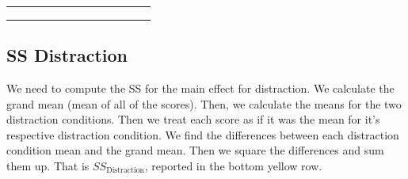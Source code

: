 \documentclass[
]{book}
\begin{document}
\begin{table}
\begin{tabular}{l|l|l|l|l|l|l|l|l|>{}l|>{}l|>{}l|>{}l}
\hline
\cellcolor{lightgreen}{Means} & \cellcolor{lightgreen}{9.6} & \cellcolor{lightgreen}{3.6} & \cellcolor{lightgreen}{12.6} & \cellcolor{lightgreen}{10} & \cellcolor{lightgreen}{} & \cellcolor{lightgreen}{} & \cellcolor{lightgreen}{} & \cellcolor{lightgreen}{} & \cellcolor{yellow}{} & \cellcolor{yellow}{} & \cellcolor{yellow}{} & \cellcolor{yellow}{}\\
\hline
\cellcolor{lightgreen}{Grand Mean} & \cellcolor{lightgreen}{8.95} & \cellcolor{lightgreen}{} & \cellcolor{lightgreen}{} & \cellcolor{lightgreen}{} & \cellcolor{lightgreen}{} & \cellcolor{lightgreen}{} & \cellcolor{lightgreen}{} & \cellcolor{lightgreen}{} & \cellcolor{yellow}{} & \cellcolor{yellow}{} & \cellcolor{yellow}{} & \cellcolor{yellow}{}\\
\hline
\cellcolor{yellow}{sums} & \cellcolor{yellow}{} & \cellcolor{yellow}{} & \cellcolor{yellow}{} & \cellcolor{yellow}{} & \cellcolor{yellow}{} & \cellcolor{yellow}{} & \cellcolor{yellow}{} & \cellcolor{yellow}{Sums} & \cellcolor{yellow}{7.3125} & \cellcolor{yellow}{148.3125} & \cellcolor{yellow}{71.8125} & \cellcolor{yellow}{15.5125}\\
\hline
\cellcolor{yellow}{SS Total} & \cellcolor{yellow}{} & \cellcolor{yellow}{} & \cellcolor{yellow}{} & \cellcolor{yellow}{} & \cellcolor{yellow}{} & \cellcolor{yellow}{} & \cellcolor{yellow}{} & \cellcolor{yellow}{SS Total} & \cellcolor{yellow}{242.95} & \cellcolor{yellow}{} & \cellcolor{yellow}{} & \cellcolor{yellow}{}\\
\hline
\end{tabular}
\end{table}

\subsection{SS Distraction}\label{ss-distraction}

We need to compute the SS for the main effect for distraction. We calculate the grand mean (mean of all of the scores). Then, we calculate the means for the two distraction conditions. Then we treat each score as if it was the mean for it's respective distraction condition. We find the differences between each distraction condition mean and the grand mean. Then we square the differences and sum them up. That is \(SS_\text{Distraction}\), reported in the bottom yellow row.
\end{document}
